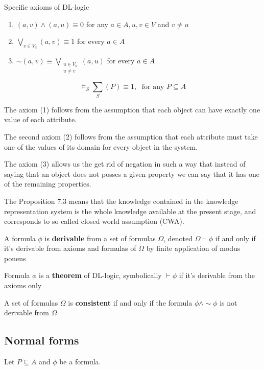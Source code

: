 \documentclass[11pt]{article}
\begin{document}
Specific axioms of DL-logic
\begin{enumerate}
\item \((a,v)\wedge(a,u)\equiv 0\) for any \(a\in A,u,v\in V\) and \(v\neq u\)
\item \(\displaystyle\bigvee_{v\in V_a}(a,v)\equiv 1\) for every \(a\in A\)
\item \(\sim(a,v)\equiv\displaystyle\bigvee_{\substack{u\in V_a\\ u\neq v}}(a,u)\) for every
\(a\in A\)
\end{enumerate}


\begin{proposition}[7.3]
\begin{equation*}
\models_S \displaystyle\sum_{S}(P)\equiv 1,\;\text{ for any } 
P\subseteq A
\end{equation*}
\end{proposition}

The axiom (1) follows from the assumption that each object can have exactly
one value of each attribute.

The second axiom (2) follows from the assumption that each attribute must
take one of the values of its domain for every object in the system. 

The axiom (3) allows us the get rid of negation in such a way that instead of
saying that an object does not posses a given property we can say that it has
one of the remaining properties.

The Proposition 7.3 means that the knowledge contained in the knowledge
representation system is the whole knowledge available at the present stage,
and corresponds to so called closed world assumption (CWA).


A formula \(\phi\) is \textbf{derivable} from a set of formulas \(\Omega\), denoted \(\Omega\vdash\phi\) if
and only if it's derivable from axioms and formulas of \(\Omega\) by finite
application of modus ponens

Formula \(\phi\) is a \textbf{theorem} of DL-logic, symbolically \(\vdash \phi\) if it's derivable
from the axioms only


A set of formulas \(\Omega\) is \textbf{consistent} if and only if the formula \(\phi\wedge\sim\phi\) is not
derivable from \(\Omega\)
\subsection{Normal forms}
\label{sec:orge5b34df}
Let \(P\subseteq A\) and \(\phi\) be a formula.
\end{document}

